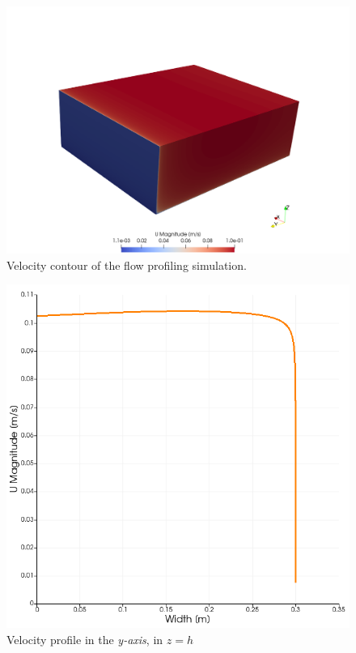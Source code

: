 \documentclass[../main.tex]{subfiles}
\begin{document}
\begin{figure}[!ht]
  \centering
  \includegraphics[width=\linewidth]{../images/methods/flowProfVelocity.png}
  \caption{Velocity contour of the flow profiling simulation.}
  \label{fig:flowProfVel}
\end{figure}
\begin{figure}[!ht]
  \centering
  \includegraphics[width=0.5\linewidth]{../images/methods/flowProfVelocityChart.png}
  \caption{Velocity profile in the \textit{y-axis}, in $z=h$}
  \label{fig:flowProfVelChart}
\end{figure}
\end{document}
